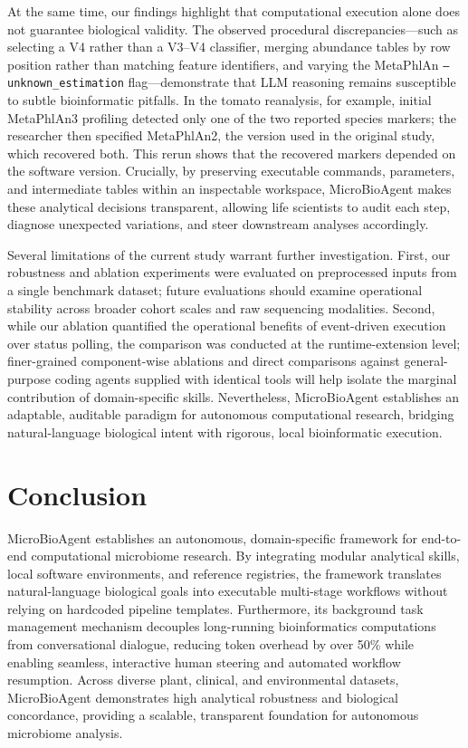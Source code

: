 \documentclass[10pt,letterpaper]{article}
\begin{document}
At the same time, our findings highlight that computational execution alone
does not guarantee biological validity. The observed procedural
discrepancies---such as selecting a V4 rather than a V3--V4 classifier,
merging abundance tables by row position rather than matching feature
identifiers, and varying the MetaPhlAn \texttt{--unknown\_estimation}
flag---demonstrate that LLM reasoning remains susceptible to subtle
bioinformatic pitfalls. In the tomato reanalysis, for example, initial
MetaPhlAn3 profiling detected only one of the two reported species markers;
the researcher then specified MetaPhlAn2, the version used in the original
study, which recovered both. This rerun shows that the recovered markers
depended on the software version. Crucially, by preserving executable
commands, parameters, and intermediate tables within an inspectable
workspace, MicroBioAgent makes these analytical decisions transparent,
allowing life scientists to audit each step, diagnose unexpected variations,
and steer downstream analyses accordingly.

Several limitations of the current study warrant further investigation.
First, our robustness and ablation experiments were evaluated on preprocessed
inputs from a single benchmark dataset; future evaluations should examine
operational stability across broader cohort scales and raw sequencing
modalities. Second, while our ablation quantified the operational benefits of
event-driven execution over status polling, the comparison was conducted at
the runtime-extension level; finer-grained component-wise ablations and
direct comparisons against general-purpose coding agents supplied with
identical tools will help isolate the marginal contribution of
domain-specific skills. Nevertheless, MicroBioAgent establishes an
adaptable, auditable paradigm for autonomous computational research, bridging
natural-language biological intent with rigorous, local bioinformatic
execution.

\section{Conclusion}

MicroBioAgent establishes an autonomous, domain-specific framework for
end-to-end computational microbiome research. By integrating modular
analytical skills, local software environments, and reference registries, the
framework translates natural-language biological goals into executable
multi-stage workflows without relying on hardcoded pipeline templates.
Furthermore, its background task management mechanism decouples
long-running bioinformatics computations from conversational dialogue,
reducing token overhead by over 50\% while enabling seamless, interactive
human steering and automated workflow resumption. Across diverse plant,
clinical, and environmental datasets, MicroBioAgent demonstrates high
analytical robustness and biological concordance, providing a scalable,
transparent foundation for autonomous microbiome analysis.
\end{document}
